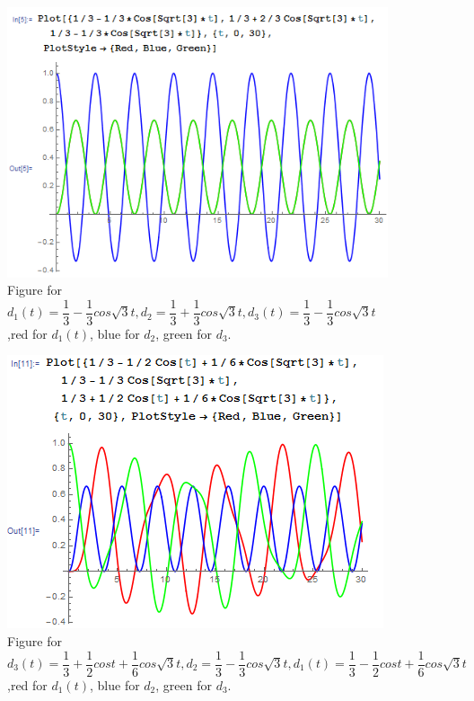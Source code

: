 \documentclass[a4paper,12pt,titlepage]{article}
\begin{document}
\begin{figure}[H]
    \centering
    \includegraphics[width=11
    cm]{52.png}
    \caption{Figure for $d_1(t)=\dfrac{1}{3}-\dfrac{1}{3}cos\sqrt{3}t,d_2=\dfrac{1}{3}+\dfrac{1}{3}cos\sqrt{3}t,d_3(t)=\dfrac{1}{3}-\dfrac{1}{3}cos\sqrt{3}t$,red for $d_1(t)$, blue for $d_2$, green for $d_3$.}
\end{figure}

\begin{figure}[H]
    \centering
    \includegraphics[width=11
    cm]{53.png}
    \caption{Figure for $d_3
    (t)=\dfrac{1}{3}+\dfrac{1}{2}cost+\dfrac{1}{6}cos\sqrt{3}t,d_2=\dfrac{1}{3}-\dfrac{1}{3}cos\sqrt{3}t,d_1(t)=\dfrac{1}{3}-\dfrac{1}{2}cost+\dfrac{1}{6}cos\sqrt{3}t$,red for $d_1(t)$, blue for $d_2$, green for $d_3$.}
\end{figure}
\end{document}
